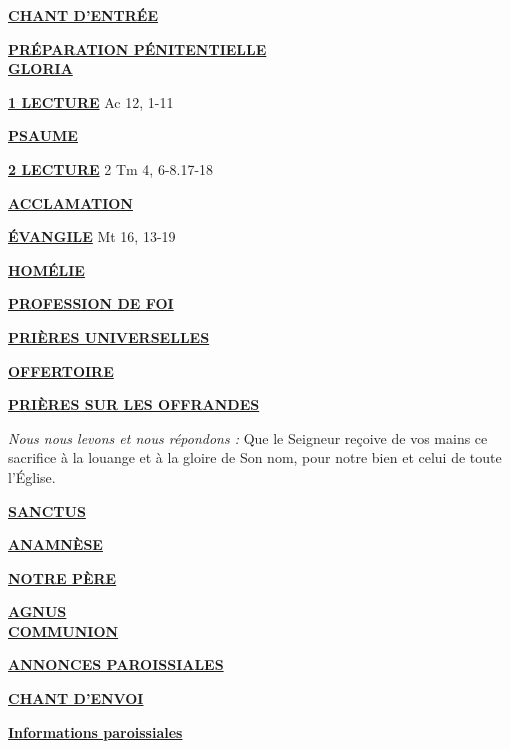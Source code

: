 \documentclass[french,11pt]{article}
\newcommand*{\chants}{../chants}
\newcommand*{\messe}{../messe_bienveillance}
\newcommand*{\pu}{../pu}
\newcommand*{\psaumes}{../psaumes}
\newcommand{\NewsItem}[1]{%
\vspace{3pt}
\underline{\textbf{#1}}
		  }
\begin{document}
\NewsItem{CHANT D'ENTRÉE}
	

\NewsItem{PRÉPARATION PÉNITENTIELLE} \\
	

\NewsItem{GLORIA}
	


\NewsItem{1\iere{} LECTURE} Ac 12, 1-11

\NewsItem{PSAUME}


\NewsItem{2\ieme{} LECTURE}  2 Tm 4, 6-8.17-18

\NewsItem{ACCLAMATION}


\NewsItem{ÉVANGILE} Mt 16, 13-19

\NewsItem{HOMÉLIE}

\NewsItem{PROFESSION DE FOI}
%


\NewsItem{PRIÈRES UNIVERSELLES}


\NewsItem{OFFERTOIRE}

\NewsItem{PRIÈRES SUR LES OFFRANDES}
\textit{Nous nous levons et nous répondons : }
Que le Seigneur reçoive de vos mains ce sacrifice à la louange et à la gloire
de Son nom, pour notre bien et celui de toute l’Église.

\NewsItem{SANCTUS}


\NewsItem{ANAMNÈSE}


\NewsItem{NOTRE PÈRE}

\NewsItem{AGNUS} \\


\NewsItem{COMMUNION}


\NewsItem{ANNONCES PAROISSIALES}


\NewsItem{CHANT D'ENVOI}


\newpage



\NewsItem{Informations paroissiales}
\end{document}

